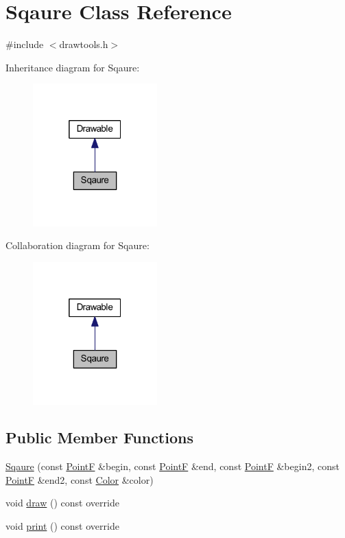 \hypertarget{class_sqaure}{}\section{Sqaure Class Reference}
\label{class_sqaure}


{\ttfamily \#include $<$drawtools.\+h$>$}



Inheritance diagram for Sqaure\+:\nopagebreak
\begin{figure}[H]
\begin{center}
\leavevmode
\includegraphics[width=136pt]{class_sqaure__inherit__graph}
\end{center}
\end{figure}


Collaboration diagram for Sqaure\+:\nopagebreak
\begin{figure}[H]
\begin{center}
\leavevmode
\includegraphics[width=136pt]{class_sqaure__coll__graph}
\end{center}
\end{figure}
\subsection*{Public Member Functions}
\begin{DoxyCompactItemize}
\item 
\hyperlink{class_sqaure_a64bbc7316e2c8b7e5c9096415b252206}{Sqaure} (const \hyperlink{drawtools_8h_adc4a66bcb59b74164130ed47cb387ec3}{PointF} \&begin, const \hyperlink{drawtools_8h_adc4a66bcb59b74164130ed47cb387ec3}{PointF} \&end, const \hyperlink{drawtools_8h_adc4a66bcb59b74164130ed47cb387ec3}{PointF} \&begin2, const \hyperlink{drawtools_8h_adc4a66bcb59b74164130ed47cb387ec3}{PointF} \&end2, const \hyperlink{struct_color}{Color} \&color)
\item 
void \hyperlink{class_sqaure_add5bf042e4d2785db26c17584d3e407e}{draw} () const  override
\item 
void \hyperlink{class_sqaure_a6a920c167c227af42d704d3184820140}{print} () const  override
\end{DoxyCompactItemize}


